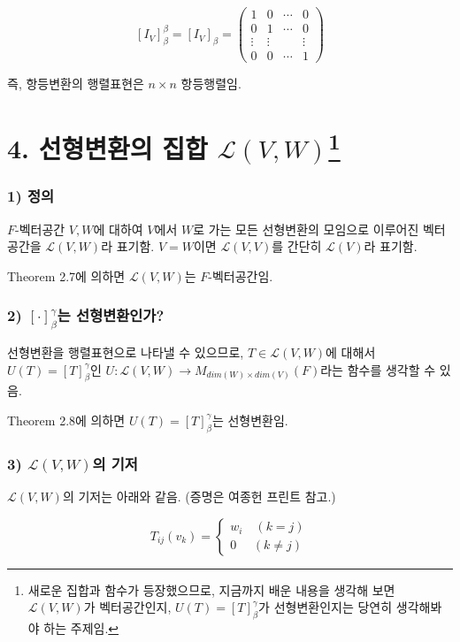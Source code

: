 \[
[I_{V}]_{\beta}^{\beta}=[I_{V}]_{\beta}=
\begin{pmatrix}
1 & 0 & \cdots & 0\\
0 & 1 & \cdots & 0\\
\vdots & \vdots & & \vdots\\
0 & 0 & \cdots & 1
\end{pmatrix}
\]

즉, 항등변환의 행렬표현은 $n \times n$ 항등행렬임.\\


\newpage


\section*{4. 선형변환의 집합 $\mathcal{L}(V,W)$\footnote{새로운 집합과 함수가 등장했으므로, 지금까지 배운 내용을 생각해 보면 $\mathcal{L}(V,W)$가 벡터공간인지, $U(T)=[T]_{\beta}^{\gamma}$가 선형변환인지는 당연히 생각해봐야 하는 주제임.}}

\subsubsection*{1) 정의\\}
\begin{DEF}
$F$-벡터공간 $V,W$에 대하여 $V$에서 $W$로 가는 모든 선형변환의 모임으로 이루어진 벡터공간을 $\mathcal{L}(V,W)$라 표기함. $V=W$이면 $\mathcal{L}(V,V)$를 간단히 $\mathcal{L}(V)$라 표기함.
\end{DEF}

Theorem 2.7에 의하면 $\mathcal{L}(V,W)$는 $F$-벡터공간임.

\subsubsection*{2) $[\cdot]_{\beta}^{\gamma}$는 선형변환인가?}
선형변환을 행렬표현으로 나타낼 수 있으므로, $T \in \mathcal{L}(V,W)$에 대해서 $U(T)=[T]_{\beta}^{\gamma}$인 $U:\mathcal{L}(V,W) \rightarrow M_{dim(W) \times dim(V)}(F)$라는 함수를 생각할 수 있음.

Theorem 2.8에 의하면 $U(T)=[T]_{\beta}^{\gamma}$는 선형변환임.

\subsubsection*{3) $\mathcal{L}(V,W)$의 기저}
$\mathcal{L}(V,W)$의 기저는 아래와 같음. (증명은 여종헌 프린트 참고.)

$$
T_{ij}(v_k)=\begin{cases}
    w_i\quad(k=j)\\
    0\,\,\quad(k \neq j)
\end{cases}
$$




